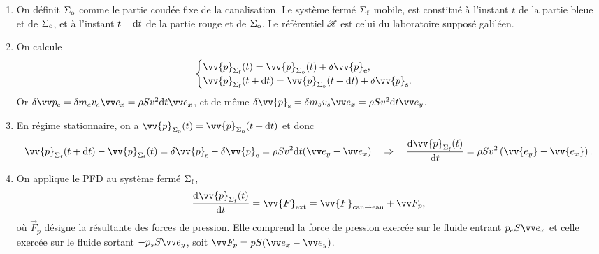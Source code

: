 \documentclass[12pt,fancy]{cours}
\begin{document}
 \begin{enumerate}
 	\item On définit $\Sigma_{\rm o}$ comme le partie coudée fixe de la canalisation. Le système fermé $\Sigma_{\rm f}$ mobile, est constitué à l'instant $t$ de la partie bleue et de $\Sigma_{\rm o}$, et à l'instant $t+\mathrm{d} t$ de la partie rouge et de $\Sigma_{\rm o}$. Le référentiel $\mathcal{R}$ est celui du laboratoire supposé galiléen.
	\item On calcule
	\begin{equation}
	\begin{cases}
	\vv{p}_{\Sf}(t)=\vv{p}_{\So}(t)+\delta\vv{p}_{\rm{e}},\\
	\vv{p}_{\Sf}(t+\d t)=\vv{p}_{\So}(t+\d t)+\delta\vv{p}_{\rm{s}}.
	\end{cases}
	\end{equation}
	Or  $\delta \Vec{p_{\rm{e}}} = \delta m_e v_e \ex = \rho S v^2 \d t \ex$, et de même $\delta\vv{p}_{\rm{s}} = \delta m_s v_s \ex = \rho S v^2 \d t \ey$.
	\item En régime stationnaire, on a $\vv{p}_{\So}(t)=\vv{p}_{\So}(t+\d t)$ et donc
	\begin{equation}\label{eq:p_stat}
		\vv{p}_{\Sf}(t+\d t) - \vv{p}_{\Sf}(t) = \delta\vv{p}_{\rm{s}} - \delta\vv{p}_{\rm{e}} = \rho S v^2 \d t (\ey - \ex) \Rar  \frac{\d \vv{p}_{\Sf}(t)}{\d t}=\rho S v^2\left(\vv{e_y}-\vv{e_x}\right).
	\end{equation}

%

\item On applique le PFD au système fermé $\Sigma_{\rm f}$,
\begin{equation}\label{eq:PFD}
\frac{\d \vv{p}_{\Sf}(t)}{\d t}=\vv{F}_{\rm{ext}}=\vv{F}_{\rm{can\rightarrow eau}}+\Vec{F}_p,
\end{equation}
où $\Vec{F}_p$ désigne la résultante des forces de pression. Elle comprend la force de pression exercée sur le fluide entrant $p_e S \ex $ et celle exercée sur le fluide sortant $-p_s S \ey$, soit $\Vec{F}_p = pS(\ex-\ey)$.
\end{enumerate}
\end{document}
